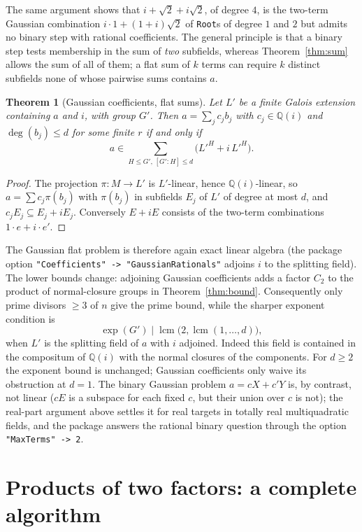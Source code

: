 \documentclass[11pt,a4paper]{article}
\newtheorem{theorem}{Theorem}[section]
\theoremstyle{definition}
\theoremstyle{remark}
\newcommand{\Q}{\mathbb{Q}}
\newcommand{\lcm}{\operatorname{lcm}}
\newcommand{\dg}{\deg}
\newcommand{\code}[1]{\texttt{#1}}
\newcommand{\Root}{\code{Root}}
\begin{document}
The same argument shows that $i+\sqrt2+i\sqrt2$, of degree $4$, is the two-term Gaussian combination
$i\cdot1+(1+i)\sqrt2$ of \Root{}s of degree $1$ and $2$ but admits no binary step with rational
coefficients.  The general principle is that a binary step tests membership in the sum of \emph{two}
subfields, whereas Theorem~\ref{thm:sum} allows the sum of all of them; a flat sum of $k$ terms can
require $k$ distinct subfields none of whose pairwise sums contains $a$.

\begin{theorem}[Gaussian coefficients, flat sums]\label{thm:gaussian}
Let $L'$ be a finite Galois extension containing $a$ and $i$, with group $G'$.  Then $a=\sum_jc_jb_j$
with $c_j\in\Q(i)$ and $\dg(b_j)\le d$ for some finite $r$ if and only if
\[
 a\in\sum_{H\le G',\,[G':H]\le d}\bigl(L'^H+i\,L'^H\bigr).
\]
\end{theorem}

\begin{proof}
The projection $\pi:M\to L'$ is $L'$-linear, hence $\Q(i)$-linear, so $a=\sum c_j\pi(b_j)$ with
$\pi(b_j)$ in subfields $E_j$ of $L'$ of degree at most $d$, and $c_jE_j\subseteq E_j+iE_j$.  Conversely
$E+iE$ consists of the two-term combinations $1\cdot e+i\cdot e'$.
\end{proof}

The Gaussian flat problem is therefore again exact linear algebra (the package option
\code{"Coefficients" -> "GaussianRationals"} adjoins $i$ to the splitting field).  The lower bounds
change: adjoining Gaussian coefficients adds a factor $C_2$ to the product of normal-closure groups
in Theorem~\ref{thm:bound}.  Consequently only prime divisors $\ge3$ of $n$ give the prime bound, while
the sharper exponent condition is
\[
 \exp(G')\mid\lcm\bigl(2,\lcm(1,\dots,d)\bigr),
\]
when $L'$ is the splitting field of $a$ with $i$ adjoined.  Indeed this field is contained in the
compositum of $\Q(i)$ with the normal closures of the components.  For $d\ge2$ the exponent bound
is unchanged; Gaussian coefficients only waive its obstruction at $d=1$.  The binary Gaussian problem $a=cX+c'Y$ is, by
contrast, not linear ($cE$ is a subspace for each fixed $c$, but their union over $c$ is not); the
real-part argument above settles it for real targets in totally real multiquadratic fields, and the
package answers the rational binary question through the option \code{"MaxTerms" -> 2}.

\section{Products of two factors: a complete algorithm}\label{sec:products}
\end{document}
